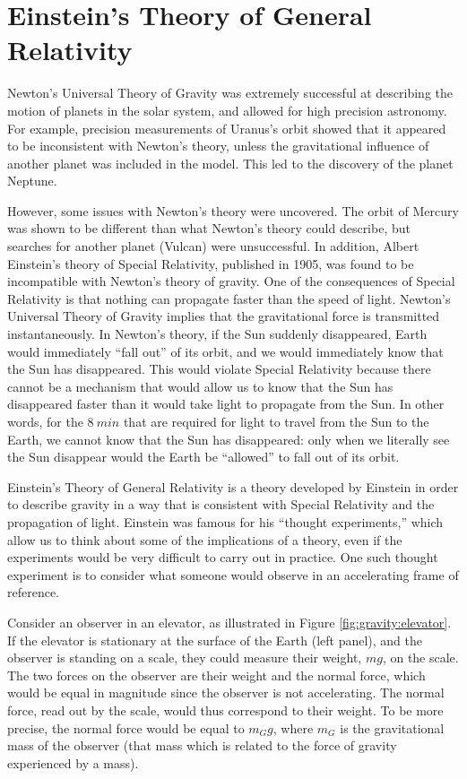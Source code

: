\section{Einstein's Theory of General Relativity}
Newton's Universal Theory of Gravity was extremely successful at describing the motion of planets in the solar system, and allowed for high precision astronomy. For example, precision measurements of  Uranus's orbit showed that it appeared to be inconsistent with Newton's theory, unless the gravitational influence of another planet was included in the model. This led to the discovery of the planet Neptune. 

However, some issues with Newton's theory were uncovered. The orbit of Mercury was shown to be different than what Newton's theory could describe, but searches for another planet (Vulcan) were unsuccessful. In addition, Albert Einstein's theory of Special Relativity, published in 1905, was found to be incompatible with Newton's theory of gravity. One of the consequences of Special Relativity is that nothing can propagate faster than the speed of light. Newton's Universal Theory of Gravity implies that the gravitational force is transmitted instantaneously. In Newton's theory, if the Sun suddenly disappeared, Earth would immediately ``fall out'' of its orbit, and we would immediately know that the Sun has disappeared. This would violate Special Relativity because there cannot be a mechanism that would allow us to know that the Sun has disappeared faster than it would take light to propagate from the Sun. In other words, for the $\SI{8}{min}$ that are required for light to travel from the Sun to the Earth, we cannot know that the Sun has disappeared: only when we literally see the Sun disappear would the Earth be ``allowed'' to fall out of its orbit.

Einstein's Theory of General Relativity is a theory developed by Einstein in order to describe gravity in a way that is consistent with Special Relativity and the propagation of light. Einstein was famous for his ``thought experiments,'' which allow us to think about some of the implications of a theory, even if the experiments would be very difficult to carry out in practice. One such thought experiment is to consider what someone would observe in an accelerating frame of reference.

Consider an observer in an elevator, as illustrated in Figure \ref{fig:gravity:elevator}. If the elevator is stationary at the surface of the Earth (left panel), and the observer is standing on a scale, they could measure their weight, $mg$, on the scale. The two forces on the observer are their weight and the normal force, which would be equal in magnitude since the observer is not accelerating. The normal force, read out by the scale, would thus correspond to their weight. To be more precise, the normal force would be equal to $m_Gg$, where $m_G$ is the gravitational mass of the observer (that mass which is related to the force of gravity experienced by a mass).

